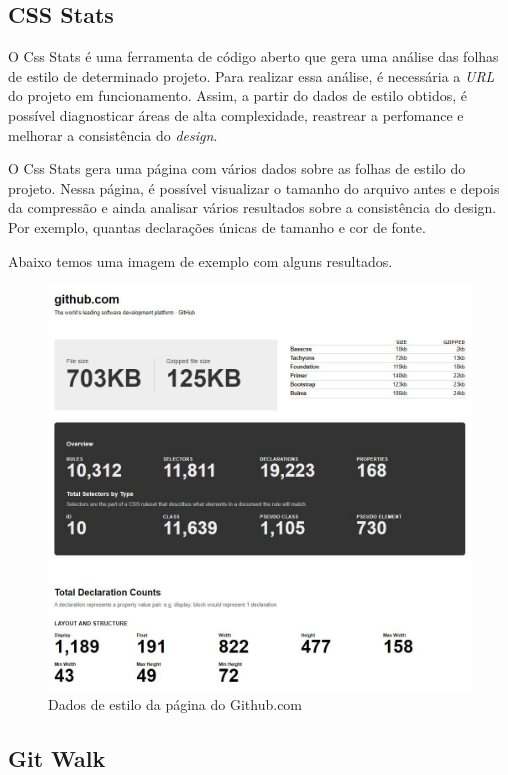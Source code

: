 \hypertarget{cssstats}{%
\subsection{CSS Stats}\label{cssstats}}

O Css Stats é uma ferramenta de código aberto que gera uma análise das folhas de estilo de determinado projeto. Para realizar essa análise, é necessária a \emph{URL} do projeto em funcionamento. Assim, a partir do dados de estilo obtidos, é possível diagnosticar áreas de alta complexidade, reastrear a perfomance e melhorar a consistência do \emph{design}.

O Css Stats gera uma página com vários dados sobre as folhas de estilo do projeto. Nessa página, é possível visualizar o tamanho do arquivo antes e depois da compressão e ainda analisar vários resultados sobre a consistência do design. Por exemplo, quantas declarações únicas de tamanho e cor de fonte.

Abaixo temos uma imagem de exemplo com alguns resultados.

\begin{figure}[H]
\centering
\includegraphics{figuras/Capturar.JPG}
\caption{Dados de estilo da página do Github.com}
\end{figure}

\hypertarget{gitwalk}{%
\subsection{Git Walk}\label{gitwalk}}

